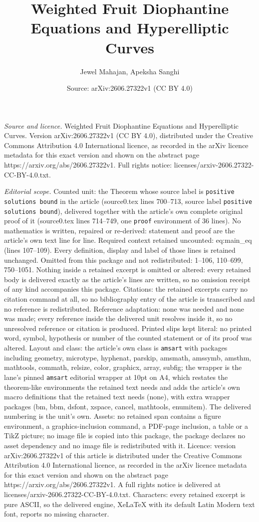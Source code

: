 \documentclass[10pt,a4paper]{amsart}
\title[Weighted Fruit Diophantine Equations and Hyperelliptic Curve]{Weighted Fruit Diophantine Equations and Hyperelliptic Curves}
\author{Jewel Mahajan, Apeksha Sanghi}
\date{Source: arXiv:2606.27322v1 (CC BY 4.0)}
\begin{document}
\maketitle

\noindent\emph{Source and licence.} Weighted Fruit Diophantine Equations and Hyperelliptic Curves. Version arXiv:2606.27322v1 (CC BY 4.0), distributed under the Creative Commons Attribution 4.0 International licence, as recorded in the arXiv licence metadata for this exact version and shown on the abstract page https://arxiv.org/abs/2606.27322v1. Full rights notice: licenses/arxiv-2606.27322-CC-BY-4.0.txt.\par\smallskip

\noindent\textit{Editorial scope.} Counted unit: the Theorem whose source label is \texttt{positive solutions bound} in the article (source0.tex lines 700--713, source label \texttt{positive solutions bound}), delivered together with the article's own complete original proof of it (source0.tex lines 714--749, one \texttt{proof} environment of 36 lines). No mathematics is written, repaired or re-derived: statement and proof are the article's own text line for line. Required context retained uncounted: eq:main\_eq (lines 107--109). Every definition, display and label of those lines is retained unchanged. Omitted from this package and not redistributed: 1--106, 110--699, 750--1051. Nothing inside a retained excerpt is omitted or altered: every retained body is delivered exactly as the article's lines are written, so no omission receipt of any kind accompanies this package. Citations: the retained excerpts carry no citation command at all, so no bibliography entry of the article is transcribed and no reference is redistributed. Reference adaptation: none was needed and none was made; every reference inside the delivered unit resolves inside it, so no unresolved reference or citation is produced. Printed slips kept literal: no printed word, symbol, hypothesis or number of the counted statement or of its proof was altered. Layout and class: the article's own class is \texttt{amsart} with packages including geometry, microtype, hyphenat, parskip, amsmath, amssymb, amsthm, mathtools, commath, relsize, color, graphicx, array, subfig; the wrapper is the lane's pinned \texttt{amsart} editorial wrapper at 10pt on A4, which restates the theorem-like environments the retained text needs and adds the article's own macro definitions that the retained text needs (none), with extra wrapper packages (bm, bbm, dsfont, xspace, cancel, mathtools, enumitem). The delivered numbering is the unit's own. Assets: no retained span contains a figure environment, a graphics-inclusion command, a PDF-page inclusion, a table or a TikZ picture; no image file is copied into this package, the package declares no asset dependency and no image file is redistributed with it. Licence: version arXiv:2606.27322v1 of this article is distributed under the Creative Commons Attribution 4.0 International licence, as recorded in the arXiv licence metadata for this exact version and shown on the abstract page https://arxiv.org/abs/2606.27322v1. A full rights notice is delivered at licenses/arxiv-2606.27322-CC-BY-4.0.txt. Characters: every retained excerpt is pure ASCII, so the delivered engine, XeLaTeX with its default Latin Modern text font, reports no missing character.
\end{document}
